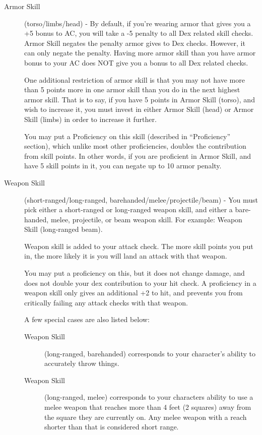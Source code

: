 \begin{description}
\item[Armor Skill] (torso/limbs/head) - By default, if you’re wearing armor that gives you a +5 bonus to AC, you will take a -5 penalty to all Dex related skill checks. Armor Skill negates the penalty armor gives to Dex checks. However, it can only negate the penalty. Having more armor skill than you have armor bonus to your AC does NOT give you a bonus to all Dex related checks.

One additional restriction of armor skill is that you may not have more than 5 points more in one armor skill than you do in the next highest armor skill. That is to say, if you have 5 points in Armor Skill (torso), and wish to increase it, you must invest in either Armor Skill (head) or Armor Skill (limbs) in order to increase it further.

You may put a Proficiency on this skill (described in “Proficiency” section), which unlike most other proficiencies, doubles the contribution from skill points. In other words, if you are proficient in Armor Skill, and have 5 skill points in it, you can negate up to 10 armor penalty.

\item[Weapon Skill] (short-ranged/long-ranged, barehanded/melee/projectile/beam) - You must pick either a short-ranged or long-ranged weapon skill, and either a bare-handed, melee, projectile, or beam weapon skill. For example: Weapon Skill (long-ranged beam).

Weapon skill is added to your attack check. The more skill points you put in, the more likely it is you will land an attack with that weapon.

You may put a proficiency on this, but it does not change damage, and does not double your dex contribution to your hit check. A proficiency in a weapon skill only gives an additional +2 to hit, and prevents you from critically failing any attack checks with that weapon.

A few special cases are also listed below:
\begin{description}
\item[Weapon Skill] (long-ranged, barehanded) corresponds to your character’s ability to accurately throw things.
\item[Weapon Skill] (long-ranged, melee) corresponds to your characters ability to use a melee weapon that reaches more than 4 feet (2 squares) away from the square they are currently on. Any melee weapon with a reach shorter than that is considered short range.
\end{description}


\end{description}
